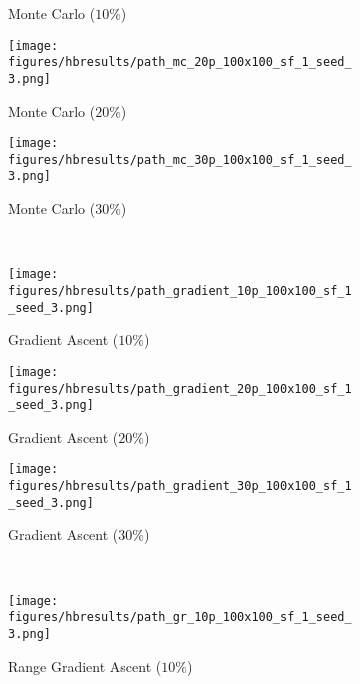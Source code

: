 \begin{figure}[htb!]
\begin{subfigure}[t]{0.32\textwidth}
        \ssp
        \captionsetup{skip=0.20\baselineskip,size=footnotesize}
        \caption{Monte Carlo ($10\%$)}
    \end{subfigure}%
    \begin{subfigure}[t]{0.32\textwidth}
        \centering
        \texttt{[image: figures/hbresults/path\_mc\_20p\_100x100\_sf\_1\_seed\_3.png]}
        \ssp
        \captionsetup{skip=0.20\baselineskip,size=footnotesize}
        \caption{Monte Carlo ($20\%$)}
    \end{subfigure}%
    \begin{subfigure}[t]{0.32\textwidth}
        \centering
        \texttt{[image: figures/hbresults/path\_mc\_30p\_100x100\_sf\_1\_seed\_3.png]}
        \ssp
        \captionsetup{skip=0.20\baselineskip,size=footnotesize}
        \caption{Monte Carlo ($30\%$)}
    \end{subfigure}%
    \\
    \begin{subfigure}[t]{0.32\textwidth}
        \centering
        \texttt{[image: figures/hbresults/path\_gradient\_10p\_100x100\_sf\_1\_seed\_3.png]}
        \ssp
        \captionsetup{skip=0.20\baselineskip,size=footnotesize}
        \caption{Gradient Ascent ($10\%$)}
    \end{subfigure}%
    \begin{subfigure}[t]{0.32\textwidth}
        \centering
        \texttt{[image: figures/hbresults/path\_gradient\_20p\_100x100\_sf\_1\_seed\_3.png]}
        \ssp
        \captionsetup{skip=0.20\baselineskip,size=footnotesize}
        \caption{Gradient Ascent ($20\%$)}
    \end{subfigure}%
    \begin{subfigure}[t]{0.32\textwidth}
        \centering
        \texttt{[image: figures/hbresults/path\_gradient\_30p\_100x100\_sf\_1\_seed\_3.png]}
        \ssp
        \captionsetup{skip=0.20\baselineskip,size=footnotesize}
        \caption{Gradient Ascent ($30\%$)}
    \end{subfigure}%
    \\
    \begin{subfigure}[t]{0.32\textwidth}
        \centering
        \texttt{[image: figures/hbresults/path\_gr\_10p\_100x100\_sf\_1\_seed\_3.png]}
        \ssp
        \captionsetup{skip=0.20\baselineskip,size=footnotesize}
        \caption{Range Gradient Ascent ($10\%$)}
    \end{subfigure}%
    \begin{subfigure}[t]{0.32\textwidth}

\end{subfigure}
\end{figure}

